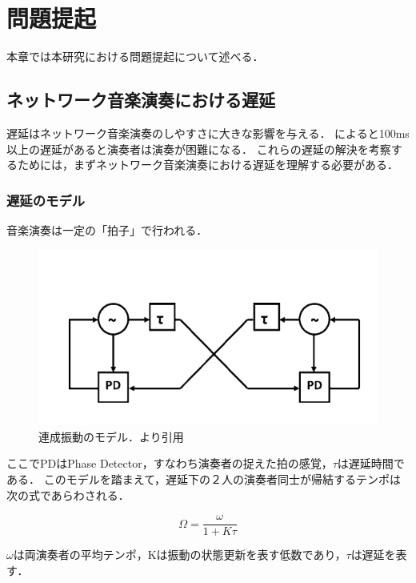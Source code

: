 \chapter{問題提起}
\label{related}

本章では本研究における問題提起について述べる．

\section{ネットワーク音楽演奏における遅延}
遅延はネットワーク音楽演奏のしやすさに大きな影響を与える．
\cite{latency:effect}によると100ms以上の遅延があると演奏者は演奏が困難になる．
これらの遅延の解決を考察するためには，まずネットワーク音楽演奏における遅延を理解する必要がある．

\subsection{遅延のモデル}
音楽演奏は一定の「拍子」で行われる．


\begin{figure}
  \centering
  \includegraphics[width=0.8\linewidth]{src/latencymodel.png}
  \caption{連成振動のモデル．\cite{latency:model}より引用}
  \label{fig:oscillator}
\end{figure}

ここでPDはPhase Detector，すなわち演奏者の捉えた拍の感覚，\begin{math}\tau\end{math}は遅延時間である．
このモデルを踏まえて，遅延下の２人の演奏者同士が帰結するテンポは次の式であらわされる．

\begin{displaymath}
  \Omega = \frac{\omega }{1 + K\tau}
\end{displaymath}

\begin{math}\omega \end{math}は両演奏者の平均テンポ，Kは振動の状態更新を表す低数であり，\begin{math}\tau \end{math}は遅延を表す．

